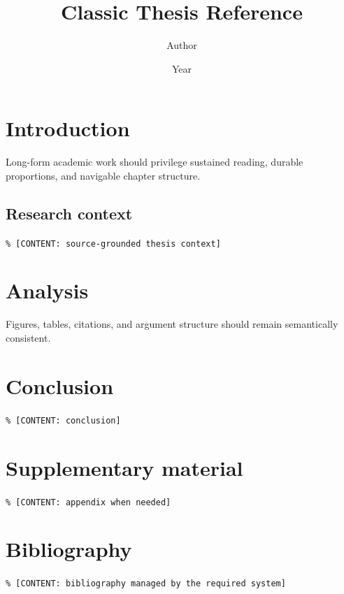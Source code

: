 \documentclass[11pt,a4paper,twoside,openright]{scrbook}
\begin{document}
\frontmatter
\title{Classic Thesis Reference}\author{Author}\date{Year}\maketitle\tableofcontents
\mainmatter
\chapter{Introduction}Long-form academic work should privilege sustained reading, durable proportions, and navigable chapter structure.
\section{Research context}\texttt{\% [CONTENT: source-grounded thesis context]}
\chapter{Analysis}Figures, tables, citations, and argument structure should remain semantically consistent.
\chapter{Conclusion}\texttt{\% [CONTENT: conclusion]}
\appendix\chapter{Supplementary material}\texttt{\% [CONTENT: appendix when needed]}
\backmatter
\chapter*{Bibliography}\texttt{\% [CONTENT: bibliography managed by the required system]}
\end{document}
